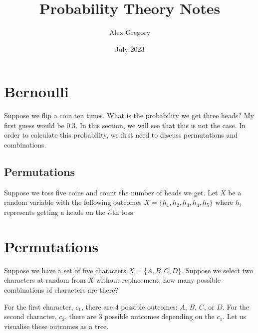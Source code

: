 \documentclass{article}
\title{Probability Theory Notes}
\author{Alex Gregory}
\date{July 2023}
\begin{document}
\maketitle

\section{Bernoulli}

Suppose we flip a coin ten times. What is the probability we get three heads? My first guess would be 0.3. In this section, we will see that this is not the case. In order to calculate this probability, we first need to discuss permutations and combinations.

\subsection{Permutations}

Suppose we toss five coins and count the number of heads we get. Let $X$ be a random variable with the following outcomes $X = \{h_1, h_2, h_3, h_4, h_5\}$  where $h_i$ represents getting a heads on the $i$-th toss.

\section{Permutations}

Suppose we have a set of five characters $X = \{ A, B, C, D \}$. Suppose we select two characters at random from $X$ without replacement, how many possible combinations of characters are there?

For the first character, $c_1$, there are 4 possible outcomes: $A$, $B$, $C$, or $D$. For the second character, $c_2$, there are 3 possible outcomes depending on the $c_1$. Let us visualise these outcomes as a tree.

\end{document}
